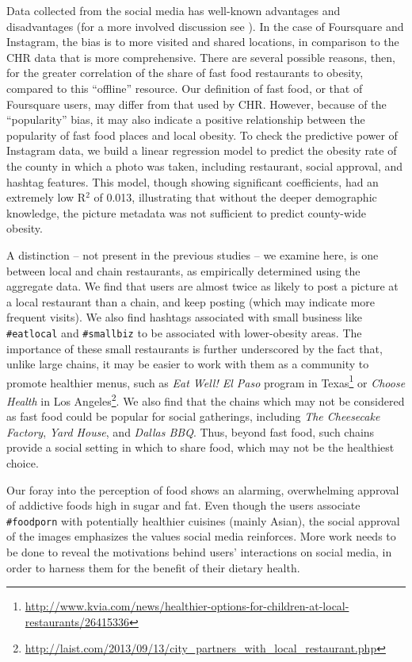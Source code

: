 \documentclass{sig-alternate-2013}
\begin{document}
Data collected from the social media has well-known advantages and disadvantages (for a more involved discussion see \cite{abbar2014you}). In the case of Foursquare and Instagram, the bias is to more visited and shared locations, in comparison to the CHR data that is more comprehensive. There are several possible reasons, then, for the greater correlation of the share of fast food restaurants to obesity, compared to this ``offline'' resource. Our definition of fast food, or that of Foursquare users, may differ from that used by CHR. However, because of the ``popularity'' bias, it may also indicate a positive relationship between the popularity of fast food places and local obesity. To check the predictive power of Instagram data, we build a linear regression model to predict the obesity rate of the county in which a photo was taken, including restaurant, social approval, and hashtag features. This model, though showing significant coefficients, had an extremely low R$^2$ of 0.013, illustrating that without the deeper demographic knowledge, the picture metadata was not sufficient to predict county-wide obesity. 

A distinction -- not present in the previous studies -- we examine here, is one between local and chain restaurants, as empirically determined using the aggregate data. We find that users are almost twice as likely to post a picture at a local restaurant than a chain, and keep posting (which may indicate more frequent visits). We also find hashtags associated with small business like \texttt{\#eatlocal} and \texttt{\#smallbiz} to be associated with lower-obesity areas. The importance of these small restaurants is further underscored by the fact that, unlike large chains, it may be easier to work with them as a community to promote healthier menus, such as \emph{Eat Well! El Paso} program in Texas\footnote{\url{http://www.kvia.com/news/healthier-options-for-children-at-local-restaurants/26415336}} or \emph{Choose Health} in Los Angeles\footnote{\url{http://laist.com/2013/09/13/city_partners_with_local_restaurant.php}}. We also find that the chains which may not be considered as fast food could be popular for social gatherings, including \emph{The Cheesecake Factory}, \emph{Yard House}, and \emph{Dallas BBQ}. Thus, beyond fast food, such chains provide a social setting in which to share food, which may not be the healthiest choice. 

Our foray into the perception of food shows an alarming, overwhelming approval of addictive foods high in sugar and fat. Even though the users associate \texttt{\#foodporn} with potentially healthier cuisines (mainly Asian), the social approval of the images emphasizes the values social media reinforces. More work needs to be done to reveal the motivations behind users' interactions on social media, in order to harness them for the benefit of their dietary health.
\end{document}
